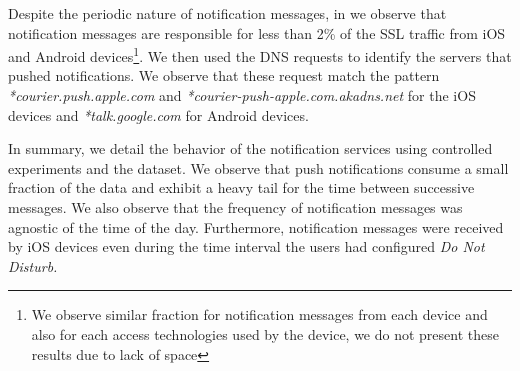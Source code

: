 Despite the periodic nature of notification messages, in  we observe that notification messages are responsible for less than 2\% of the SSL traffic from iOS and Android devices\footnote{We observe similar fraction for notification messages from each device and also for each access technologies used by the device, we do not present these results due to lack of space}.
We then used the DNS requests to identify the servers that pushed notifications.
We observe that these request match the pattern \emph{*courier.push.apple.com} and \emph{*courier-push-apple.com.akadns.net} for the iOS devices and \emph{*talk.google.com} for Android devices. 

In summary, we detail the behavior of the notification services using controlled experiments and the \mobWild dataset.  
We observe that push notifications consume a small fraction of the data and exhibit a heavy tail for the time between successive messages. 
We also observe that the frequency of notification messages was agnostic of the time of the day. 
Furthermore, notification messages were received by iOS devices even during the time interval the users had configured \emph{Do Not Disturb.}








